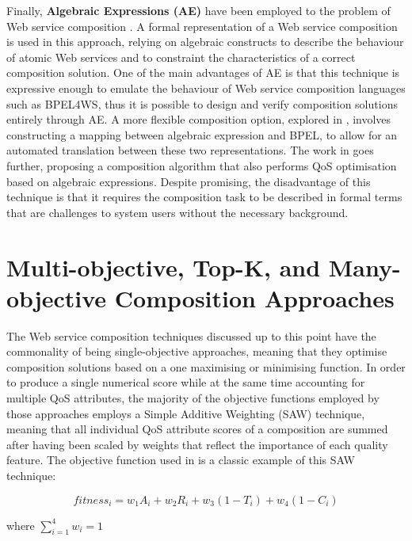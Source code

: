 Finally, \textbf{Algebraic Expressions (AE)} have been employed to the problem of Web service composition \cite{ferrara2004web, kattepur2013qos}. A formal representation of a Web service composition is used in this approach, relying on algebraic constructs to describe the behaviour of atomic Web services and to constraint the characteristics of a correct composition solution. One of the main advantages of AE is that this technique is expressive enough to emulate the behaviour of Web service composition languages such as BPEL4WS, thus it is possible to design and verify composition solutions entirely through AE. A more flexible composition option, explored in \cite{ferrara2004web}, involves constructing a mapping between algebraic expression and BPEL, to allow for an automated translation between these two representations. The work in \cite{kattepur2013qos} goes further, proposing a composition algorithm that also performs QoS optimisation based on algebraic expressions. Despite promising, the disadvantage of this technique is that it requires the composition task to be described in formal terms that are challenges to system users without the necessary background.

\section{Multi-objective, Top-K, and Many-objective Composition Approaches}\label{MultiObjective}

The Web service composition techniques discussed up to this point have the commonality of being single-objective approaches, meaning that they optimise composition solutions based on a one maximising or minimising function. In order to produce a single numerical score while at the same time accounting for multiple QoS attributes, the majority of the objective functions employed by those approaches employs a Simple Additive Weighting (SAW) \cite{hwang1981lecture} technique, meaning that all individual QoS attribute scores of a composition are summed after having been scaled by weights that reflect the importance of each quality feature. The objective function used in \cite{da2014graph} is a classic example of this SAW technique:

\begin{equation}
fitness_i = w_1A_i + w_2R_i + w_3(1 - T_i) + w_4(1 - C_i)
\end{equation}

\centerline{where $\sum_{i=1}^{4} w_i = 1$}
\vspace{0.7cm}

